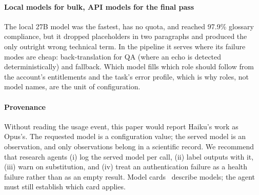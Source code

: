 \paragraph{Local models for bulk, API models for the final pass}
The local 27B model was the fastest, has no quota, and reached 97.9\% glossary compliance, but it dropped placeholders in two paragraphs and produced the only outright wrong technical term. In the pipeline it serves where its failure modes are cheap: back-translation for QA (where an echo is detected deterministically) and fallback. Which model fills which role should follow from the account's entitlements and the task's error profile, which is why roles, not model names, are the unit of configuration.

\paragraph{Provenance}
Without reading the usage event, this paper would report Haiku's work as Opus's. The requested model is a configuration value; the served model is an observation, and only observations belong in a scientific record. We recommend that research agents (i) log the served model per call, (ii) label outputs with it, (iii) warn on substitution, and (iv) treat an authentication failure as a health failure rather than as an empty result. Model cards~\cite{mitchell2019modelcards} describe models; the agent must still establish which card applies.
